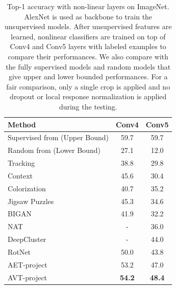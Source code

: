 \documentclass[10pt,journal,compsoc,twoside]{IEEEtran}
\begin{document}
\begin{table}
\caption{Top-1 accuracy with non-linear layers on ImageNet. AlexNet is used as backbone to train the unsupervised models. After unsupervised features are learned, nonlinear classifiers are trained on top of Conv4 and Conv5 layers with labeled examples to compare their performances. We also compare with the fully supervised models and random models that give upper and lower bounded performances. For a fair comparison, only a single crop is applied and no dropout or local response normalization is applied during the testing. }\label{tab05}
\centering
 \begin{tabular}{l|cc} \toprule
Method&Conv4 &Conv5\\ \midrule
Supervised from \cite{bojanowski2017unsupervised}(Upper Bound)&59.7&59.7  \\
Random from \cite{noroozi2016unsupervised} (Lower Bound)&27.1 &12.0  \\ \midrule
Tracking \cite{wang2015unsupervised} &38.8&29.8 \\
Context \cite{doersch2015unsupervised} &45.6&30.4 \\
Colorization \cite{zhang2016colorful}&40.7&35.2 \\
Jigsaw Puzzles \cite{noroozi2016unsupervised}&45.3&34.6\\
BIGAN \cite{donahue2016adversarial}&41.9&32.2\\
NAT \cite{bojanowski2017unsupervised}&-&36.0\\
DeepCluster \cite{caron2018deep} &-&44.0\\
RotNet \cite{gidaris2018unsupervised}&50.0&43.8\\\midrule
AET-project  &{53.2}&{47.0}\\
AVT-project &\textbf{54.2}&\textbf{48.4}\\\bottomrule
\end{tabular}
\end{table}
\end{document}
